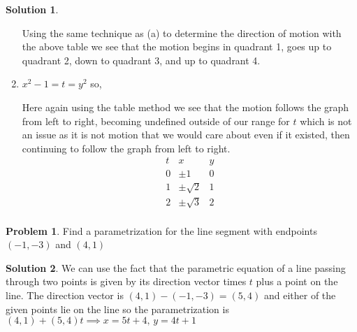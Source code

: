 \documentclass[10pt]{article}
\theoremstyle{definition}
\newtheorem{problem}{Problem}
\newtheorem{soln}{Solution}
\begin{document}
\begin{soln}
\begin{enumerate}[label=(\alph*)]
\begin{center}
          \end{center}
          Using the same technique as (a) to determine the direction of motion with the above table we see that the motion begins in quadrant 1, goes up
          to quadrant 2, down to quadrant 3, and up to quadrant 4.
    \item $x^2-1=t=y^2$ so,
          \begin{center}
          \end{center}
          Here again using the table method we see that the motion follows the graph from left to right, becoming undefined outside of our range for $t$ which is
          not an issue as it is not motion that we would care about even if it existed, then continuing to follow the graph from left to right.
          \begin{displaymath}
            \begin{array}{|c|c|c|}
              t & x           & y \\
              \hline
              0 & \pm1        & 0 \\
              1 & \pm\sqrt{2} & 1 \\
              2 & \pm\sqrt{3} & 2 \\
            \end{array}
          \end{displaymath}
  \end{enumerate}
\end{soln}

\begin{problem} Find a parametrization for the line segment with endpoints $(-1, -3)$ and $(4, 1)$
\end{problem}
\begin{soln}
We can use the fact that the parametric equation of a line passing through two points is given by its direction vector times $t$ plus a point on the line. The direction vector
is $(4,1)-(-1,-3)=(5,4)$ and either of the given points lie on the line so the parametrization is $(4,1)+(5,4)t\implies x=5t+4,\, y=4t+1$
\end{soln}
\end{document}

